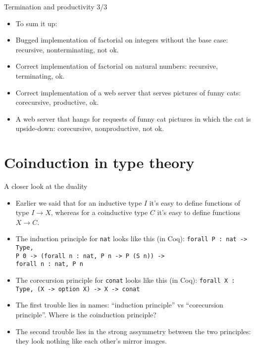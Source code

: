 \documentclass{beamer}
\begin{document}
\begin{frame}{Termination and productivity 3/3}
\begin{itemize}
	\item To sum it up:
	\item Bugged implementation of factorial on integers without the base case: recursive, nonterminating, not ok.
	\item Correct implementation of factorial on natural numbers: recursive, terminating, ok.
	\item Correct implementation of a web server that serves pictures of funny cats: corecursive, productive, ok.
	\item A web server that hangs for requests of funny cat pictures in which the cat is upside-down: corecursive, nonproductive, not ok.
\end{itemize}
\end{frame}

\section{Coinduction in type theory}

\begin{frame}{A closer look at the duality}
\begin{itemize}
	\item Earlier we said that for an inductive type $I$ it's easy to define functions of type $I \to X$, whereas for a coinductive type $C$ it's easy to define functions $X \to C$.
	\item The induction principle for \texttt{nat} looks like this (in Coq): \texttt{forall P : nat -> Type, \\ P 0 -> (forall n : nat, P n -> P (S n)) -> \\ forall n : nat, P n}
	\item The corecursion principle for \texttt{conat} looks like this (in Coq): \texttt{forall X : Type, (X -> option X) -> X -> conat}
	\item The first trouble lies in names: ``induction principle'' vs ``corecursion principle''. Where is the coinduction principle?
	\item The second trouble lies in the strong assymmetry between the two principles: they look nothing like each other's mirror images.
\end{itemize}
\end{frame}
\end{document}
